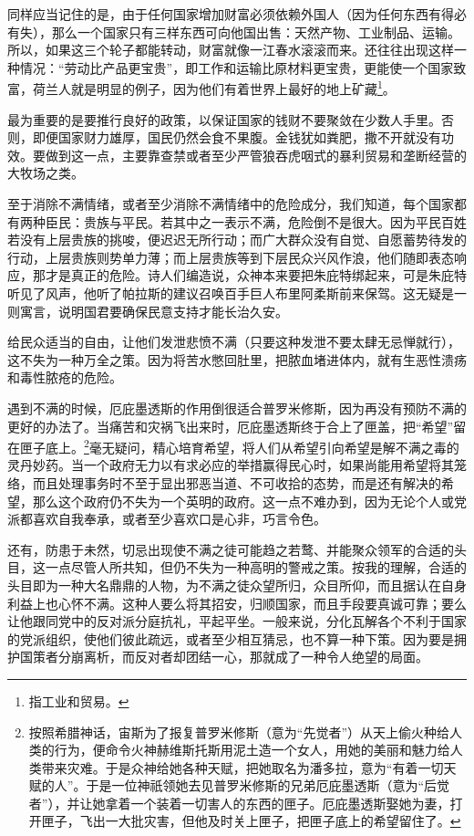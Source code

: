 \par 同样应当记住的是，由于任何国家增加财富必须依赖外国人（因为任何东西有得必有失），那么一个国家只有三样东西可向他国出售：天然产物、工业制品、运输。所以，如果这三个轮子都能转动，财富就像一江春水滚滚而来。还往往出现这样一种情况：“劳动比产品更宝贵”，即工作和运输比原材料更宝贵，更能使一个国家致富，荷兰人就是明显的例子，因为他们有着世界上最好的地上矿藏\footnote{指工业和贸易。}。
\par 最为重要的是要推行良好的政策，以保证国家的钱财不要聚敛在少数人手里。否则，即便国家财力雄厚，国民仍然会食不果腹。金钱犹如粪肥，撒不开就没有功效。要做到这一点，主要靠查禁或者至少严管狼吞虎咽式的暴利贸易和垄断经营的大牧场之类。
\par 至于消除不满情绪，或者至少消除不满情绪中的危险成分，我们知道，每个国家都有两种臣民：贵族与平民。若其中之一表示不满，危险倒不是很大。因为平民百姓若没有上层贵族的挑唆，便迟迟无所行动；而广大群众没有自觉、自愿蓄势待发的行动，上层贵族则势单力薄；而上层贵族等到下层民众兴风作浪，他们随即表态响应，那才是真正的危险。诗人们编造说，众神本来要把朱庇特绑起来，可是朱庇特听见了风声，他听了帕拉斯的建议召唤百手巨人布里阿柔斯前来保驾。这无疑是一则寓言，说明国君要确保民意支持才能长治久安。
\par 给民众适当的自由，让他们发泄悲愤不满（只要这种发泄不要太肆无忌惮就行），这不失为一种万全之策。因为将苦水憋回肚里，把脓血堵进体内，就有生恶性溃疡和毒性脓疮的危险。
\par 遇到不满的时候，厄庇墨透斯的作用倒很适合普罗米修斯，因为再没有预防不满的更好的办法了。当痛苦和灾祸飞出来时，厄庇墨透斯终于合上了匣盖，把“希望”留在匣子底上。\footnote{按照希腊神话，宙斯为了报复普罗米修斯（意为“先觉者”）从天上偷火种给人类的行为，便命令火神赫维斯托斯用泥土造一个女人，用她的美丽和魅力给人类带来灾难。于是众神给她各种天赋，把她取名为潘多拉，意为“有着一切天赋的人”。于是一位神祇领她去见普罗米修斯的兄弟厄庇墨透斯（意为“后觉者”），并让她拿着一个装着一切害人的东西的匣子。厄庇墨透斯娶她为妻，打开匣子，飞出一大批灾害，但他及时关上匣子，把匣子底上的希望留住了。}毫无疑问，精心培育希望，将人们从希望引向希望是解不满之毒的灵丹妙药。当一个政府无力以有求必应的举措赢得民心时，如果尚能用希望将其笼络，而且处理事务时不至于显出邪恶当道、不可收拾的态势，而是还有解决的希望，那么这个政府仍不失为一个英明的政府。这一点不难办到，因为无论个人或党派都喜欢自我奉承，或者至少喜欢口是心非，巧言令色。
\par 还有，防患于未然，切忌出现使不满之徒可能趋之若鹜、并能聚众领军的合适的头目，这一点尽管人所共知，但仍不失为一种高明的警戒之策。按我的理解，合适的头目即为一种大名鼎鼎的人物，为不满之徒众望所归，众目所仰，而且据认在自身利益上也心怀不满。这种人要么将其招安，归顺国家，而且手段要真诚可靠；要么让他跟同党中的反对派分庭抗礼，平起平坐。一般来说，分化瓦解各个不利于国家的党派组织，使他们彼此疏远，或者至少相互猜忌，也不算一种下策。因为要是拥护国策者分崩离析，而反对者却团结一心，那就成了一种令人绝望的局面。

